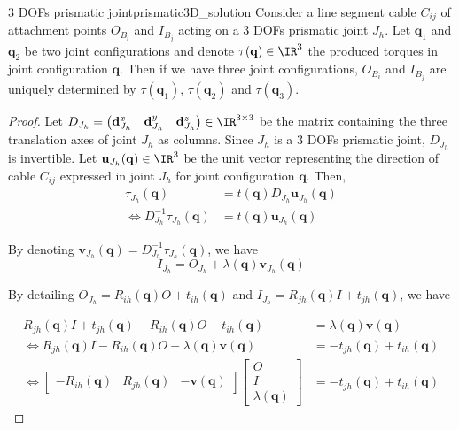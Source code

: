 \begin{theorembox}{3 DOFs prismatic joint}{prismatic3D_solution}
    Consider a line segment cable $C_{ij}$ of attachment points $O_{B_i}$ and $I_{B_j}$ acting on a 3 DOFs prismatic joint $J_h$. Let $\mathbf{q}_1$ and $\mathbf{q}_2$ be two joint configurations and denote $\tau(\mathbf{q})\in\IR^3$ the produced torques in joint configuration $\mathbf{q}$. Then if we have three joint configurations, $O_{B_i}$ and $I_{B_j}$ are uniquely determined by $\tau(\mathbf{q}_1)$, $\tau(\mathbf{q}_2)$ and $\tau(\mathbf{q}_3)$.
\end{theorembox}
\begin{proof}
    Let $D_{J_h} = \begin{pmatrix}
        \mathbf{d}_{J_h}^x & \mathbf{d}_{J_h}^y & \mathbf{d}_{J_h}^z
    \end{pmatrix}\in \IR^{3\times 3}$ be the matrix containing the three translation axes of joint $J_h$ as columns. Since $J_h$ is a 3 DOFs prismatic joint, $D_{J_h}$ is invertible. Let $\mathbf{u}_{J_h}(\mathbf{q})\in\IR^3$ be the unit vector representing the direction of cable $C_{ij}$ expressed in joint $J_h$ for joint configuration $\mathbf{q}$. Then,
    \begin{align*}
        \tau_{J_h}(\mathbf{q}) &= t(\mathbf{q})D_{J_h}\mathbf{u}_{J_h}(\mathbf{q}) \\
        \iff D_{J_h}^{-1}\tau_{J_h}(\mathbf{q}) &= t(\mathbf{q})\mathbf{u}_{J_h}(\mathbf{q})
    \end{align*}

    By denoting $\mathbf{v}_{J_h}(\mathbf{q}) = D_{J_h}^{-1}\tau_{J_h}(\mathbf{q})$, we have 
    $$I_{J_h} = O_{J_h} + \lambda(\mathbf{q}) \mathbf{v}_{J_h}(\mathbf{q})$$

    By detailing $O_{J_h} = R_{ih}(\mathbf{q})O + t_{ih}(\mathbf{q})$ and $I_{J_h} = R_{jh}(\mathbf{q})I + t_{jh}(\mathbf{q})$, we have

    \begin{align*}
        R_{jh}(\mathbf{q})I + t_{jh}(\mathbf{q}) - R_{ih}(\mathbf{q})O - t_{ih}(\mathbf{q}) &= \lambda(\mathbf{q})\mathbf{v}(\mathbf{q}) \\
        \iff R_{jh}(\mathbf{q})I  - R_{ih}(\mathbf{q})O - \lambda(\mathbf{q})\mathbf{v}(\mathbf{q}) &= - t_{jh}(\mathbf{q}) + t_{ih}(\mathbf{q}) \\
        \iff \begin{bmatrix}
            - R_{ih}(\mathbf{q}) & R_{jh}(\mathbf{q}) & -\mathbf{v}(\mathbf{q})
        \end{bmatrix}\begin{bmatrix}
            O \\ I \\ \lambda(\mathbf{q})
        \end{bmatrix} &= - t_{jh}(\mathbf{q}) + t_{ih}(\mathbf{q})
    \end{align*}


\end{proof}
